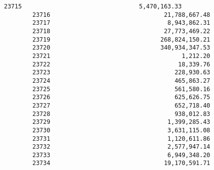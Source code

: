 \documentclass[11pt]{article}
\begin{document}
\begin{Verbatim}[commandchars=\\\{\}]
        23715                                 5,470,163.33   
        23716                                21,788,667.48   
        23717                                 8,943,862.31   
        23718                                27,773,469.22   
        23719                               268,824,150.21   
        23720                               340,934,347.53   
        23721                                     1,212.20   
        23722                                    18,339.76   
        23723                                   228,930.63   
        23724                                   465,863.27   
        23725                                   561,580.16   
        23726                                   625,626.75   
        23727                                   652,718.40   
        23728                                   938,012.83   
        23729                                 1,399,285.43   
        23730                                 3,631,115.08   
        23731                                 1,120,611.86   
        23732                                 2,577,947.14   
        23733                                 6,949,348.20   
        23734                                19,170,591.71   
        

\end{Verbatim}
\end{document}
